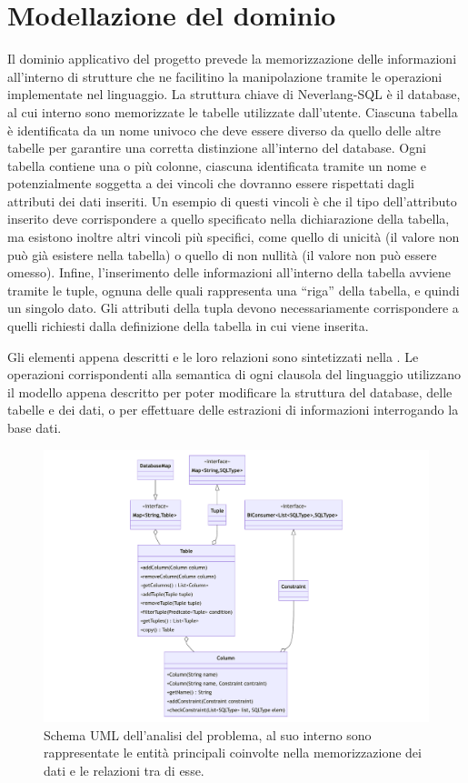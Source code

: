\documentclass[12pt,a4paper,openright,twoside]{book}
\begin{document}
\section{Modellazione del dominio}
Il dominio applicativo del progetto prevede la memorizzazione delle informazioni all’interno di strutture che ne facilitino la manipolazione 
tramite le operazioni implementate nel linguaggio. La struttura chiave di Neverlang-SQL è il database, al cui interno sono memorizzate le 
tabelle utilizzate dall’utente. Ciascuna tabella è identificata da un nome univoco che deve essere diverso da quello delle altre tabelle 
per garantire una corretta distinzione all’interno del database. Ogni tabella contiene una o più colonne, ciascuna identificata tramite un 
nome e potenzialmente soggetta a dei vincoli che dovranno essere rispettati dagli attributi dei dati inseriti. Un esempio di questi vincoli 
è che il tipo dell’attributo inserito deve corrispondere a quello specificato nella dichiarazione della tabella, ma esistono inoltre altri 
vincoli più specifici, come quello di unicità (il valore non può già esistere nella tabella) o quello di non nullità (il valore non può 
essere omesso). Infine, l’inserimento delle informazioni all’interno della tabella avviene tramite le tuple, ognuna delle quali rappresenta 
una ``riga'' della tabella, e quindi un singolo dato. Gli attributi della tupla devono necessariamente corrispondere a quelli richiesti 
dalla definizione della tabella in cui viene inserita.

Gli elementi appena descritti e le loro relazioni sono sintetizzati nella . Le operazioni corrispondenti alla 
semantica di ogni clausola del linguaggio utilizzano il modello appena descritto per poter modificare la struttura del database, delle 
tabelle e dei dati, o per effettuare delle estrazioni di informazioni interrogando la base dati.

\begin{figure}
    \centering
    \includegraphics[width=.8\linewidth]{figures/model-diagram.pdf}
    \caption{Schema UML dell'analisi del problema, al suo interno sono rappresentate le entità principali coinvolte nella memorizzazione 
            dei dati e le relazioni tra di esse.}
    \label{fig:model-diagram}
\end{figure}
\end{document}
